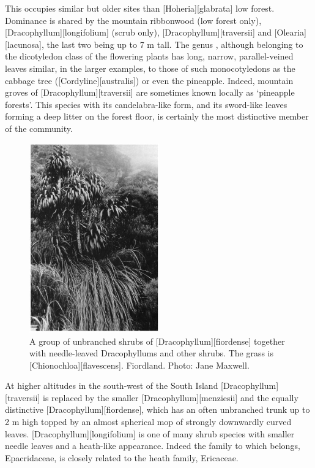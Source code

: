 This occupies similar but older sites than [Hoheria][glabrata] low forest.
Dominance is shared by the mountain ribbonwood (low forest only), [Dracophyllum][longifolium] (scrub only), [Dracophyllum][traversii] and [Olearia][lacunosa], the last two being up to 7 m tall.
The genus , although belonging to the dicotyledon class of the flowering plants has long, narrow, parallel-veined leaves similar, in the larger examples, to those of such monocotyledons as the cabbage tree ([Cordyline][australis]) or even the pineapple.
Indeed, mountain groves of [Dracophyllum][traversii] are sometimes known locally as `pineapple forests'.
This species with its candelabra-like form, and its sword-like leaves forming a deep litter on the forest floor, is certainly the most distinctive member of the community.

\begin{figure}
	\includegraphics[width=0.5\textwidth]{graphics/figure92dracophyllum.jpg}
	\centering
	\caption[A group of unbranched shrubs of \emph{Dracophyllum fiordense}]{A group of unbranched shrubs of [Dracophyllum][fiordense] together with needle-leaved Dracophyllums and other shrubs.
	The grass is [Chionochloa][flavescens].
	Fiordland.
	Photo: Jane Maxwell.}%
	\label{fig:92dracophyllum}
\end{figure}

At higher altitudes in the south-west of the South Island [Dracophyllum][traversii] is replaced by the smaller [Dracophyllum][menziesii] and the equally distinctive [Dracophyllum][fiordense], which has an often unbranched trunk up to 2 m high topped by an almost spherical mop of strongly downwardly curved leaves. [Dracophyllum][longifolium] is one of many shrub species with smaller needle leaves and a heath-like appearance.
Indeed the family to which  belongs, Epacridaceae, is closely related to the heath family, Ericaceae.

